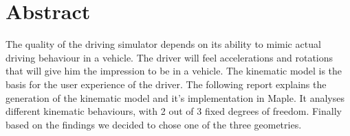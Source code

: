 \section{Abstract}

The quality of the driving simulator depends on its ability to mimic actual driving behaviour in a vehicle. The driver will feel accelerations and rotations that will give him the impression to be in a vehicle. The kinematic model is the basis for the user experience of the driver. The following report explains the generation of the kinematic model and it's implementation in Maple. It analyses different kinematic behaviours, with 2 out of 3 fixed degrees of freedom. Finally based on the findings we decided to chose one of the three geometries.